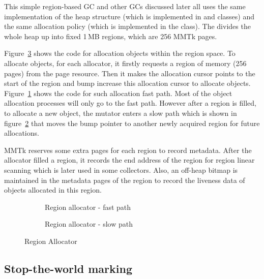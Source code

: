 This simple region-based GC and other GCs discussed later all uses the same implementation of the
heap structure (which is implemented in  and  classes) and the
same allocation policy (which is implemented in the  class).
The  divides the whole heap up into fixed 1\,MB regions, which
are 256 MMTk pages.

Figure~\ref{fig:allocator} shows the code for allocation objects within the region space.
To allocate objects, for each allocator, it firstly requests a region of memory (256 pages) from the page resource.
Then it makes the allocation cursor points to the start of the region and bump increase this
allocation cursor to allocate objects. Figure~\ref{fig:allocator:fast} shows the code for such
allocation fast path. Most of the object allocation processes will only go to the
fast path. 
However after a region is filled, to allocate a new object, the mutator enters a slow path
which is shown in figure~\ref{fig:allocator:slow} that moves the bump pointer to another newly acquired region for future allocations.

MMTk reserves some extra pages for each region to record metadata.
After the allocator filled a region, it records the end address of the region for 
region linear scanning which is later used in some collectors. Also, an off-heap bitmap is
maintained in the metadata pages of the region to record the liveness data of objects allocated
in this region.

\begin{figure}
  \centering
  \begin{subfigure}[a]{\textwidth}
    
    \caption{Region allocator - fast path}
    \label{fig:allocator:fast}
  \end{subfigure}

  \begin{subfigure}[b]{\textwidth}
    
    \caption{Region allocator - slow path}
    \label{fig:allocator:slow}
  \end{subfigure}

  \caption{Region Allocator}
  \label{fig:allocator}
\end{figure}

\subsection{Stop-the-world marking}

